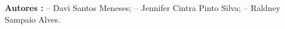 \documentclass{article}
\begin{document}
\Huge{\bf Autores :}
\newline
\newline
-- Davi Santos Meneses;
\newline
\newline
-- Jennifer Cintra Pinto Silva;
\newline
\newline
-- Raldney Sampaio Alves.
\end{document}
